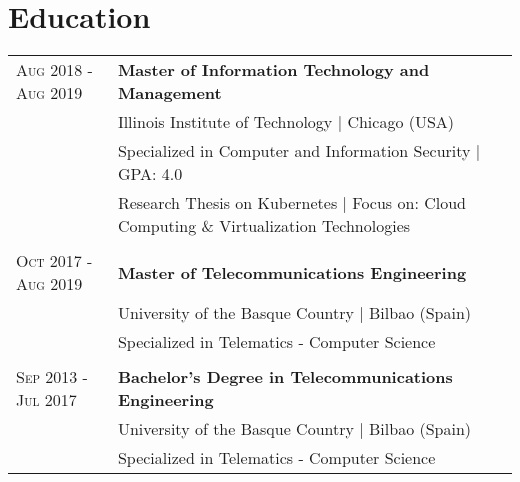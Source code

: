 \documentclass[a4paper,10pt]{article}
\begin{document}
\section{Education}
\begin{tabular}{p{3.2cm}l}

 \textsc{Aug 2018 - Aug 2019}& \textbf{Master of Information Technology and Management}\\
 & \footnotesize{Illinois Institute of Technology | Chicago (USA)} \\
 & Specialized in Computer and Information Security | GPA: 4.0 \\ 
 & \footnotesize{Research Thesis on Kubernetes | Focus on: Cloud Computing \& Virtualization Technologies} \\ &\\[-0.05in]

 \textsc{Oct 2017 - Aug 2019}& \textbf{Master of Telecommunications Engineering}\\
 & \footnotesize{University of the Basque Country | Bilbao (Spain)} \\
 & Specialized in Telematics - Computer Science \\ &\\[-0.05in]
 
 \textsc{Sep 2013 - Jul 2017}& \textbf{Bachelor's Degree in Telecommunications Engineering}\\
 & \footnotesize{University of the Basque Country | Bilbao (Spain)} \\
 & Specialized in Telematics - Computer Science 

\end{tabular}

\end{document}
